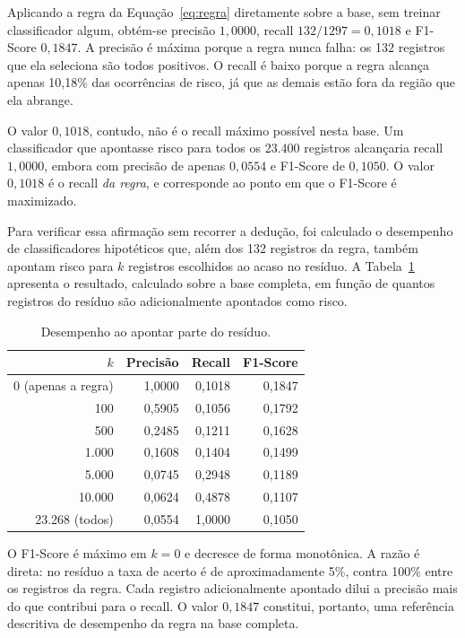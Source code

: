 Aplicando a regra da Equação~\ref{eq:regra} diretamente sobre a base, sem treinar classificador algum, obtém-se precisão $1{,}0000$, recall $132 / 1297 = 0{,}1018$ e F1-Score $0{,}1847$. A precisão é máxima porque a regra nunca falha: os 132 registros que ela seleciona são todos positivos. O recall é baixo porque a regra alcança apenas 10{,}18\% das ocorrências de risco, já que as demais estão fora da região que ela abrange.

O valor $0{,}1018$, contudo, não é o recall máximo possível nesta base. Um classificador que apontasse risco para todos os 23.400 registros alcançaria recall $1{,}0000$, embora com precisão de apenas $0{,}0554$ e F1-Score de $0{,}1050$. O valor $0{,}1018$ é o recall \textit{da regra}, e corresponde ao ponto em que o F1-Score é maximizado.

Para verificar essa afirmação sem recorrer a dedução, foi calculado o desempenho de classificadores hipotéticos que, além dos 132 registros da regra, também apontam risco para $k$ registros escolhidos ao acaso no resíduo. A Tabela~\ref{tab:varredura} apresenta o resultado, calculado sobre a base completa, em função de quantos registros do resíduo são adicionalmente apontados como risco.

\begin{table}[H]
\centering
\caption{Desempenho ao apontar parte do resíduo.}
\label{tab:varredura}
\begin{tabular}{rrrr}
\toprule
$k$ & Precisão & Recall & F1-Score \\
\midrule
0 (apenas a regra) & 1{,}0000 & 0{,}1018 & 0{,}1847 \\
100                & 0{,}5905 & 0{,}1056 & 0{,}1792 \\
500                & 0{,}2485 & 0{,}1211 & 0{,}1628 \\
1.000              & 0{,}1608 & 0{,}1404 & 0{,}1499 \\
5.000              & 0{,}0745 & 0{,}2948 & 0{,}1189 \\
10.000             & 0{,}0624 & 0{,}4878 & 0{,}1107 \\
23.268 (todos)     & 0{,}0554 & 1{,}0000 & 0{,}1050 \\
\bottomrule
\end{tabular}
\end{table}

O F1-Score é máximo em $k = 0$ e decresce de forma monotônica. A razão é direta: no resíduo a taxa de acerto é de aproximadamente 5\%, contra 100\% entre os registros da regra. Cada registro adicionalmente apontado dilui a precisão mais do que contribui para o recall. O valor $0{,}1847$ constitui, portanto, uma referência descritiva de desempenho da regra na base completa.

